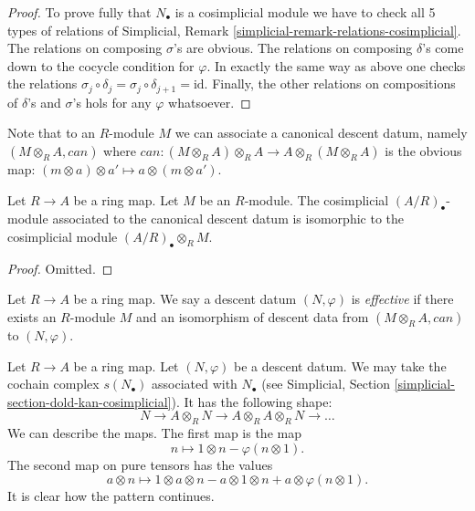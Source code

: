 \begin{proof}
\medskip\noindent
To prove fully that $N_\bullet$ is a cosimplicial module we have to check
all 5 types of relations of
Simplicial, Remark \ref{simplicial-remark-relations-cosimplicial}.
The relations on composing $\sigma$'s are obvious.
The relations on composing $\delta$'s come down to the
cocycle condition for $\varphi$.
In exactly the same way as above one checks the relations
$\sigma_j \circ \delta_j = \sigma_j \circ \delta_{j + 1} = \text{id}$.
Finally, the other relations on compositions of $\delta$'s and $\sigma$'s
hols for any $\varphi$ whatsoever.
\end{proof}

\noindent
Note that to an $R$-module $M$ we can associate a canonical
descent datum, namely $(M \otimes_R A, can)$ where
$can : (M \otimes_R A) \otimes_R A \to A \otimes_R (M \otimes_R A)$
is the obvious map:
$(m \otimes a) \otimes a' \mapsto a \otimes (m \otimes a')$.

\begin{lemma}
\label{lemma-canonical-descent-datum-cosimplicial}
Let $R \to A$ be a ring map.
Let $M$ be an $R$-module. The cosimplicial
$(A/R)_\bullet$-module associated to the canonical descent
datum is isomorphic to the cosimplicial module $(A/R)_\bullet \otimes_R M$.
\end{lemma}

\begin{proof}
Omitted.
\end{proof}

\begin{definition}
\label{definition-descent-datum-effective-module}
Let $R \to A$ be a ring map.
We say a descent datum $(N, \varphi)$ is {\it effective}
if there exists an $R$-module $M$ and an isomorphism
of descent data from $(M \otimes_R A, can)$ to
$(N, \varphi)$.
\end{definition}

\noindent
Let $R \to A$ be a ring map.
Let $(N, \varphi)$ be a descent datum.
We may take the cochain complex $s(N_\bullet)$ associated
with $N_\bullet$ (see
Simplicial, Section \ref{simplicial-section-dold-kan-cosimplicial}).
It has the following shape:
$$
N \to A\otimes_R N \to A \otimes_R A \otimes_R N \to \ldots
$$
We can describe the maps.
The first map is the map
$$
n \longmapsto 1 \otimes n - \varphi(n \otimes 1).
$$
The second map on pure tensors has the values
$$
a \otimes n \longmapsto 1 \otimes a \otimes n
- a \otimes 1 \otimes n + a \otimes \varphi(n \otimes 1).
$$
It is clear how the pattern continues.

